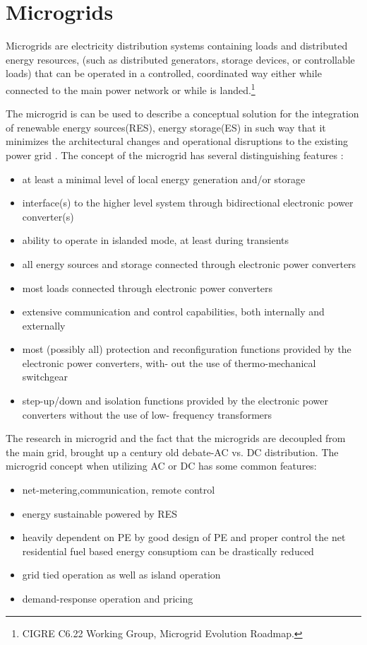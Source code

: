 \documentclass[]{scrartcl}
\newenvironment{definition}[1][Definition]{\begin{trivlist}
		\item[\hskip \labelsep {\bfseries #1}]}{\end{trivlist}}
\begin{document}
\newpage
\section{Microgrids}

\begin{definition}
	Microgrids are electricity distribution systems containing loads and distributed energy resources, (such as distributed generators, storage devices, or controllable loads) that can be operated in a controlled, coordinated way either while connected to the main power network or while is landed.\footnote{CIGRE C6.22 Working Group, Microgrid Evolution Roadmap.}\cite{Marnay2015}
\end{definition}


The microgrid is can be used to describe a conceptual solution for the integration of renewable energy sources(RES), energy storage(ES) in such way that it minimizes the architectural changes and operational disruptions to the existing power grid \cite{Lasseter2004}. The concept of the microgrid has several distinguishing features \cite{Boroyevich2013}:
\begin{itemize}
	\item at least a minimal level of local energy generation and/or storage
	\item interface(s) to the higher level system through bidirectional electronic power converter(s)
	\item ability to operate in islanded mode, at least during transients
	\item all energy sources and storage connected through electronic power converters
	\item most loads connected through electronic power converters
	\item extensive communication and control capabilities, both internally and externally
	\item most (possibly all) protection and reconfiguration functions provided by the electronic power converters, with- out the use of thermo-mechanical switchgear
	\item step-up/down and isolation functions provided by the electronic power converters without the use of low- frequency transformers
\end{itemize}


The research in microgrid and the fact that the microgrids are decoupled from the main grid, brought up a century old debate-AC vs. DC distribution.  The microgrid concept when utilizing AC or DC has some common features:
\begin{itemize}
	\item net-metering,communication, remote control
	\item energy sustainable powered by RES
	\item heavily dependent on PE
	\subitem by good design of PE and proper control the net residential fuel based energy consuptiom can be drastically reduced
	\item grid tied operation as well as island operation
	\item demand-response operation and pricing
\end{itemize}
\end{document}
